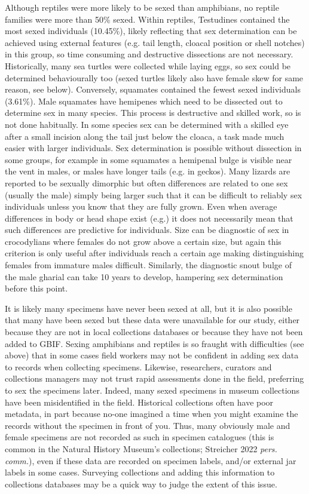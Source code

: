 \documentclass[a4paper, 12pt]{article}
\begin{document}
Although reptiles were more likely to be sexed than amphibians, no reptile families were more than 50\% sexed.
Within reptiles, Testudines contained the most sexed individuals (10.45\%), likely reflecting that sex determination can be achieved using external features (e.g. tail length, cloacal position or shell notches) in this group, so time consuming and destructive dissections are not necessary.
Historically, many sea turtles were collected while laying eggs, so sex could be determined behaviourally too (sexed turtles likely also have female skew for same reason, see below).
Conversely, squamates contained the fewest sexed individuals (3.61\%).
Male squamates have hemipenes which need to be dissected out to determine sex in many species\cite{pesantes1994method}.
This process is destructive and skilled work, so is not done habitually.
In some species sex can be determined with a skilled eye after a small incision along the tail just below the cloaca, a task made much easier with larger individuals. Sex determination is possible without dissection in some groups, for example in some squamates a hemipenal bulge is visible near the vent in males, or males have longer tails (e.g. in geckos). 
Many lizards are reported to be sexually dimorphic but often differences are related to one sex (usually the male) simply being larger such that it can be difficult to reliably sex individuals unless you know that they are fully grown.
Even when average differences in body or head shape exist (e.g.\cite{brana1996sexual,jones2020reproductive}) it does not necessarily mean that such differences are predictive for individuals.
Size can be diagnostic of sex in crocodylians where females do not grow above a certain size, but again this criterion is only useful after individuals reach a certain age making distinguishing females from immature males difficult.
Similarly, the diagnostic snout bulge of the male gharial can take 10 years to develop\cite{hone2020ontogeny}, hampering sex determination before this point. 

It is likely many specimens have never been sexed at all, but it is also possible that many have been sexed but these data were unavailable for our study, either because they are not in local collections databases or because they have not been added to GBIF. 
Sexing amphibians and reptiles is so fraught with difficulties (see above) that in some cases field workers may not be confident in adding sex data to records when collecting specimens. 
Likewise, researchers, curators and collections managers may not trust rapid assessments done in the field, preferring to sex the specimens later.
Indeed, many sexed specimens in museum collections have been misidentified in the field. 
Historical collections often have poor metadata, in part because no-one imagined a time when you might examine the records without the specimen in front of you.
Thus, many obviously male and female specimens are not recorded as such in specimen catalogues (this is common in the Natural History Museum's collections; Streicher 2022 \textit{pers. comm.}), even if these data are recorded on specimen labels, and/or external jar labels in some cases.
Surveying collections and adding this information to collections databases may be a quick way to judge the extent of this issue.
\end{document}
